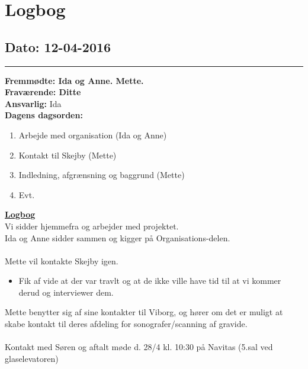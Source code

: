 \chapter{Logbog}
\section{Dato: 12-04-2016}
\hrule
\textbf{Fremmødte: Ida og Anne. Mette.} \\
\textbf{Fraværende: Ditte } \\
\textbf{Ansvarlig:} Ida  \\
\textbf{Dagens dagsorden: }
\begin{enumerate}
	\item Arbejde med organisation (Ida og Anne)
	\item Kontakt til Skejby (Mette)
	\item Indledning, afgrænsning og baggrund (Mette)
	\item Evt. 
\end{enumerate}

\underline{\textbf{Logbog}}\\
Vi sidder hjemmefra og arbejder med projektet.\\
Ida og Anne sidder sammen og kigger på Organisations-delen.\\\\
Mette vil kontakte Skejby igen.
\begin{itemize}
\item Fik af vide at der var travlt og at de ikke ville have tid til at vi kommer derud og interviewer dem.
\end{itemize}
Mette benytter sig af sine kontakter til Viborg, og hører om det er muligt at skabe kontakt til deres afdeling for sonografer/scanning af gravide.\\
\\
Kontakt med Søren og aftalt møde d. 28/4 kl. 10:30 på Navitas (5.sal ved glaselevatoren)